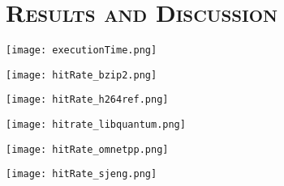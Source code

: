 \documentclass[cacheSimReport.tex]{subfiles}
\begin{document}
\section*{\textsc{\Large Results and Discussion}}

\hspace{-.9cm}\texttt{[image: executionTime.png]}

\hspace{-.9cm}\texttt{[image: hitRate\_bzip2.png]}

\hspace{-.9cm}\texttt{[image: hitRate\_h264ref.png]}

\hspace{-.9cm}\texttt{[image: hitrate\_libquantum.png]}

\hspace{-.9cm}\texttt{[image: hitRate\_omnetpp.png]}

\hspace{-.9cm}\texttt{[image: hitRate\_sjeng.png]}
\end{document}
